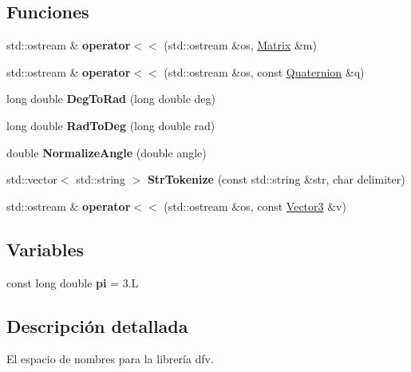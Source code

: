 \subsection*{\-Funciones}
\begin{DoxyCompactItemize}
\item 
\hypertarget{namespacedfv_ad8927f67ba8edddcac516b42526469cb}{std\-::ostream \& {\bfseries operator$<$$<$} (std\-::ostream \&os, \hyperlink{classdfv_1_1Matrix}{\-Matrix} \&m)}\label{namespacedfv_ad8927f67ba8edddcac516b42526469cb}

\item 
\hypertarget{namespacedfv_a34afb9ee3a4d367ed0ff26803a02e9a6}{std\-::ostream \& {\bfseries operator$<$$<$} (std\-::ostream \&os, const \hyperlink{classdfv_1_1Quaternion}{\-Quaternion} \&q)}\label{namespacedfv_a34afb9ee3a4d367ed0ff26803a02e9a6}

\item 
\hypertarget{namespacedfv_a728989b94aadab2a56a40bbcc93f2d06}{long double {\bfseries \-Deg\-To\-Rad} (long double deg)}\label{namespacedfv_a728989b94aadab2a56a40bbcc93f2d06}

\item 
\hypertarget{namespacedfv_a24f4e4cf53fd0ddfb8ac2359c34fbe4b}{long double {\bfseries \-Rad\-To\-Deg} (long double rad)}\label{namespacedfv_a24f4e4cf53fd0ddfb8ac2359c34fbe4b}

\item 
\hypertarget{namespacedfv_af7242e14b17694a3870a2306c7810615}{double {\bfseries \-Normalize\-Angle} (double angle)}\label{namespacedfv_af7242e14b17694a3870a2306c7810615}

\item 
\hypertarget{namespacedfv_a1e0638f940ce1dacbcb26c1b0b2c2dce}{std\-::vector$<$ std\-::string $>$ {\bfseries \-Str\-Tokenize} (const std\-::string \&str, char delimiter)}\label{namespacedfv_a1e0638f940ce1dacbcb26c1b0b2c2dce}

\item 
\hypertarget{namespacedfv_a1ba60f8078ec59cd17d8c8d34ee19240}{std\-::ostream \& {\bfseries operator$<$$<$} (std\-::ostream \&os, const \hyperlink{classdfv_1_1Vector3}{\-Vector3} \&v)}\label{namespacedfv_a1ba60f8078ec59cd17d8c8d34ee19240}

\end{DoxyCompactItemize}
\subsection*{\-Variables}
\begin{DoxyCompactItemize}
\item 
\hypertarget{namespacedfv_a71bc1ec662e3704a119726649b0b0f91}{const long double {\bfseries pi} = 3.\-L}\label{namespacedfv_a71bc1ec662e3704a119726649b0b0f91}

\end{DoxyCompactItemize}


\subsection{\-Descripción detallada}
\-El espacio de nombres para la librería dfv. 